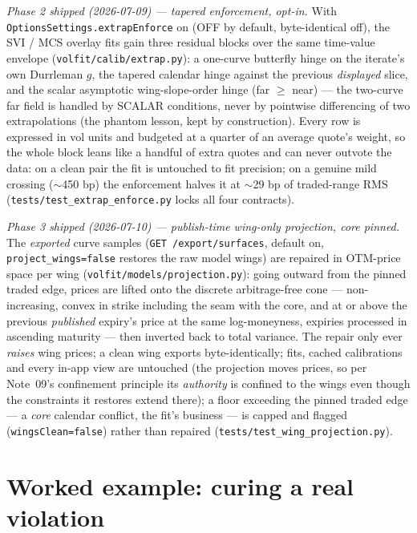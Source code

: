 \documentclass[11pt]{article}
\begin{document}
\begin{remark}
\emph{Phase 2 shipped (2026-07-09) --- tapered enforcement, opt-in.} With
\texttt{OptionsSettings.extrapEnforce} on (OFF by default, byte-identical
off), the SVI / MCS overlay fits gain three residual blocks over the same
time-value envelope (\nolinkurl{volfit/calib/extrap.py}): a one-curve
butterfly hinge on the iterate's own Durrleman $g$, the tapered calendar
hinge against the previous \emph{displayed} slice, and the scalar
asymptotic wing-slope-order hinge (far $\ge$ near) --- the two-curve far
field is handled by SCALAR conditions, never by pointwise differencing of
two extrapolations (the phantom lesson, kept by construction). Every row is
expressed in vol units and budgeted at a quarter of an average quote's
weight, so the whole block leans like a handful of extra quotes and can
never outvote the data: on a clean pair the fit is untouched to fit
precision; on a genuine mild crossing ($\sim$450 bp) the enforcement halves
it at $\sim$29 bp of traded-range RMS
(\nolinkurl{tests/test\_extrap\_enforce.py} locks all four contracts).

\emph{Phase 3 shipped (2026-07-10) --- publish-time wing-only projection,
core pinned.} The \emph{exported} curve samples
(\texttt{GET /export/surfaces}, default on, \texttt{project\_wings=false}
restores the raw model wings) are repaired in OTM-price space per wing
(\nolinkurl{volfit/models/projection.py}): going outward from the pinned
traded edge, prices are lifted onto the discrete arbitrage-free cone ---
non-increasing, convex in strike including the seam with the core, and at or
above the previous \emph{published} expiry's price at the same log-moneyness,
expiries processed in ascending maturity --- then inverted back to total
variance. The repair only ever \emph{raises} wing prices; a clean wing
exports byte-identically; fits, cached calibrations and every in-app view
are untouched (the projection moves prices, so per Note~09's confinement
principle its \emph{authority} is confined to the wings even though the
constraints it restores extend there); a floor exceeding the pinned traded
edge --- a \emph{core} calendar conflict, the fit's business --- is capped
and flagged (\texttt{wingsClean=false}) rather than repaired
(\nolinkurl{tests/test\_wing\_projection.py}).
\end{remark}

\section{Worked example: curing a real violation}
\label{sec:example}
\end{document}

